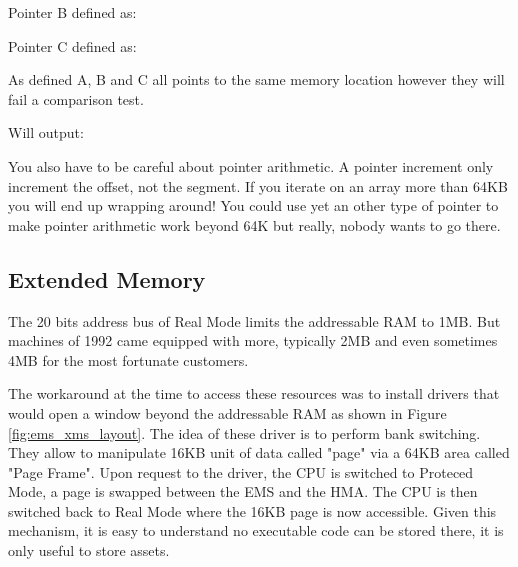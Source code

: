 \documentclass[book.tex]{subfiles}
\begin{document}
\bigskip

Pointer B defined as:\\
\par
\begin{minipage}{\textwidth}

\end{minipage}

\bigskip

Pointer C defined as:\\
\par
\begin{minipage}{\textwidth}

\end{minipage}

As defined A, B and C all points to the same memory location however they will fail a comparison test.\\

\begin{minipage}{\textwidth}

\end{minipage}
\par
Will output:\\

\begin{minipage}{\textwidth}

\end{minipage}
\par

You also have to be careful about pointer arithmetic. A  pointer increment only increment the offset, not the segment. If you iterate on an array more than 64KB you will end up wrapping around! You could use yet an other type of pointer  to make pointer arithmetic work beyond 64K but really, nobody wants to go there.




  \subsection{Extended Memory}

The 20 bits address bus of Real Mode limits the addressable RAM to 1MB. But machines of 1992 came equipped with more, typically 2MB and even sometimes 4MB for the most fortunate customers.\\
\par 
The workaround at the time to access these resources was to install drivers that would open a window beyond the addressable RAM as shown in Figure \ref{fig:ems_xms_layout}. The idea of these driver is to perform bank switching. They allow to manipulate 16KB unit of data called "page" via a 64KB area called "Page Frame". Upon request to the driver, the CPU is switched to Proteced Mode, a page is swapped between the EMS and the HMA. The CPU is then switched back to Real Mode where the 16KB page is now accessible. Given this mechanism, it is easy to understand no executable code can be stored there, it is only useful to store assets.
\end{document}
